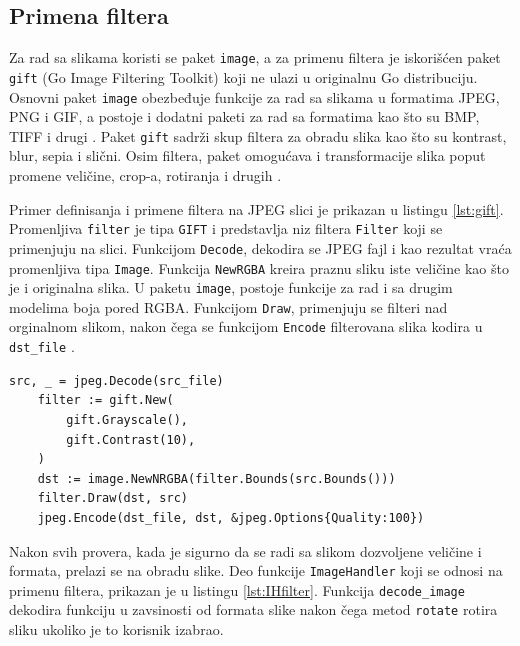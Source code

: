 \documentclass[12pt,oneside]{memoir}
\begin{document}
\subsection{Primena filtera}

Za rad sa slikama koristi se paket \texttt{image}, a za primenu filtera je iskorišćen paket \texttt{gift} (Go Image Filtering Toolkit) \cite{gift} koji ne ulazi u originalnu Go distribuciju. Osnovni paket \texttt{image} obezbeđuje funkcije za rad sa slikama u formatima JPEG, PNG i GIF, a postoje i dodatni paketi za rad sa formatima kao što su BMP, TIFF i drugi \cite{image}. Paket \texttt{gift}  sadrži skup filtera za obradu slika kao što su kontrast, blur, sepia i slični. Osim filtera, paket omogućava i transformacije slika poput promene veličine, crop-a, rotiranja i drugih \cite{gift}.

Primer definisanja i primene filtera na JPEG slici je prikazan u listingu \ref{lst:gift}. Promenljiva \texttt{filter} je tipa  \texttt{GIFT} i predstavlja niz filtera \texttt{Filter} koji se primenjuju na slici. Funkcijom \texttt{Decode}, dekodira se JPEG fajl i kao rezultat vraća promenljiva tipa  \texttt{Image}.  Funkcija \texttt{NewRGBA} kreira praznu sliku iste veličine kao što je i originalna slika. U paketu \texttt{image}, postoje funkcije za rad i sa drugim modelima boja pored RGBA. Funkcijom  \texttt{Draw}, primenjuju se filteri nad orginalnom slikom, nakon čega se funkcijom  \texttt{Encode} filterovana slika kodira u  \texttt{dst\_file} \cite{gift}.

\begin{center}
\begin{lstlisting}[caption=Definisanje i primena filtera,label={lst:gift},  backgroundcolor=\color{background}]
	src, _ = jpeg.Decode(src_file)
	filter := gift.New(
		gift.Grayscale(),
		gift.Contrast(10),
	)
	dst := image.NewNRGBA(filter.Bounds(src.Bounds()))
	filter.Draw(dst, src)
	jpeg.Encode(dst_file, dst, &jpeg.Options{Quality:100})
\end{lstlisting}
\end{center}

Nakon svih provera, kada je sigurno da se radi sa slikom dozvoljene veličine i formata, prelazi se na obradu slike. Deo funkcije  \texttt{ImageHandler} koji se odnosi na primenu filtera, prikazan je u listingu \ref{lst:IHfilter}. Funkcija  \texttt{decode\_image} dekodira funkciju u zavsinosti od formata slike nakon čega metod  \texttt{rotate} rotira sliku ukoliko je to korisnik izabrao. 
\end{document}
